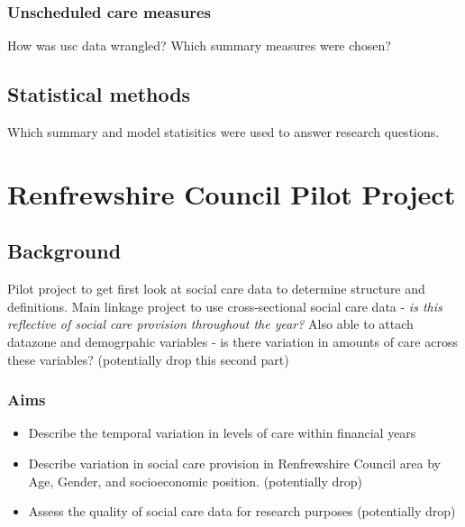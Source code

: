 \documentclass[12pt,]{report}
\providecommand{\tightlist}{%
  \setlength{\itemsep}{0pt}\setlength{\parskip}{0pt}}
\begin{document}
\subsection{Unscheduled care measures}\label{subsec:usc-summs}

How was usc data wrangled? Which summary measures were chosen?

\section{Statistical methods}

Which summary and model statisitics were used to answer research
questions.

\FloatBarrier
\newpage
{}

\chapter{Renfrewshire Council Pilot Project}\label{ch:renfrew}

\section{Background}\label{sec:renf-background}

Pilot project to get first look at social care data to determine
structure and definitions. Main linkage project to use cross-sectional
social care data -
\emph{is this reflective of social care provision throughout the year?}
Also able to attach datazone and demogrpahic variables - is there
variation in amounts of care across these variables? (potentially drop
this second part)

\subsection{Aims}\label{subsec:renfrew-aims}

\begin{itemize}
\tightlist
\item
  Describe the temporal variation in levels of care within financial
  years
\item
  Describe variation in social care provision in Renfrewshire Council
  area by Age, Gender, and socioeconomic position. (potentially drop)
\item
  Assess the quality of social care data for research purposes
  (potentially drop)
\end{itemize}
\end{document}
